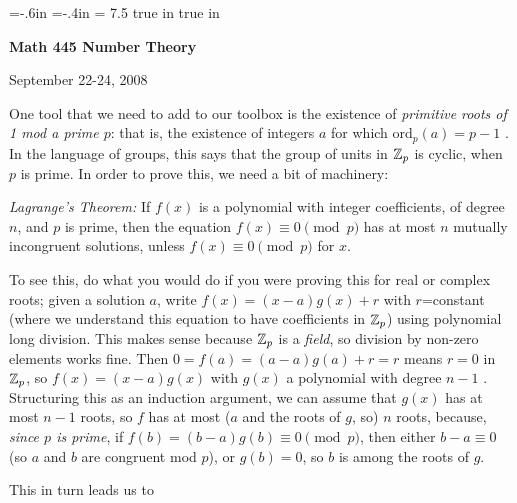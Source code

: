 





\loadmsbm

\nopagenumbers
\parindent=0pt

\voffset=-.6in
\hoffset=-.4in
\hsize = 7.5 true in
 true in


\overfullrule=0pt


\def\ctln{\centerline}
\def\u{\underbar}
\def\ssk{\smallskip}
\def\msk{\medskip}
\def\bsk{\bigskip}


\ctln{\bf Math 445 Number Theory}

\medskip

\ctln{September 22-24, 2008}

\bigskip

One tool that we need to add to our toolbox is the existence of {\it primitive roots of 1 mod a prime $p$}:
that is, the existence of integers $a$ for which ord$_p(a) = p-1$ . In the language of groups, this says 
that the group of units in ${\Bbb Z}_p$ is
cyclic, when $p$ is prime. In order to prove this, 
we need a bit of machinery:

\msk

{\it Lagrange's Theorem:} If $f(x)$ is a polynomial with integer coefficients, of degree $n$, and $p$ is prime,
then the equation $f(x)\equiv 0 \pmod{p}$ has at most $n$ mutually incongruent solutions, unless $f(x)\equiv 0 \pmod{p}$
for  $x$.

\msk

To see this, do what you would do if you were proving this for real or complex roots; given a solution $a$, write
$f(x)=(x-a)g(x)+r$ with $r$=constant (where we understand this equation to have coefficients in ${\Bbb Z}_p$) 
using polynomial long division. This makes sense because ${\Bbb Z}_p$ is a {\it field}, so division by non-zero
elements works fine. Then $0=f(a)=(a-a)g(a)+r=r$ means $r=0$ in ${\Bbb Z}_p$, so $f(x)=(x-a)g(x)$ with $g(x)$
a polynomial with degree $n-1$ . Structuring this as an induction argument, we can assume that $g(x)$ has at most
$n-1$ roots, so $f$ has at most ($a$ and the roots of $g$, so) $n$ roots, because, 
{\it since $p$ is prime}, if $f(b)=(b-a)g(b)\equiv 0\pmod{p}$, then either $b-a\equiv 0$ 
(so $a$ and $b$ are congruent mod $p$), or $g(b)=0$, so $b$ is among the roots of $g$.

\msk

This in turn leads us to 

